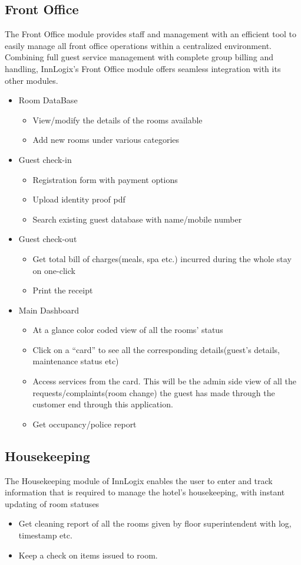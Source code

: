 \documentclass{scrreprt}
\begin{document}
\subsection{Front Office}
The Front Office module provides staff and management with an efficient tool to easily manage all front office operations within a centralized environment. Combining full guest service management with complete group billing and handling, InnLogix’s Front Office module offers seamless integration with its other modules.
\begin{itemize}
\item Room DataBase
\begin{itemize}
\item View/modify the details of the rooms available
\item Add new rooms under various categories
\end{itemize}
\item Guest check-in
\begin{itemize}
\item Registration form with payment options
\item Upload identity proof pdf
\item Search existing guest database with name/mobile number
\end{itemize}
\item Guest check-out
\begin{itemize}
\item Get total bill of charges(meals, spa etc.) incurred during the whole stay on one-click
\item Print the receipt
\end{itemize}
\item Main Dashboard
\begin{itemize}
    \item At a glance color coded view of all the rooms’ status
    \item Click on a “card” to see all the corresponding details(guest’s details, maintenance status etc)
    \item Access services from the card. This will be the admin side view of all the requests/complaints(room change) the guest has made through the customer end through this application.
    \item Get occupancy/police report
\end{itemize}
\end{itemize}

\subsection{Housekeeping}
The Housekeeping module of InnLogix enables the user to enter and track information that is required to manage the hotel’s housekeeping, with instant updating of room statuses
\begin{itemize}
    \item Get cleaning report of all the rooms given by floor superintendent with log, timestamp etc.
    \item Keep a check on items issued to room.
\end{itemize}
\end{document}
